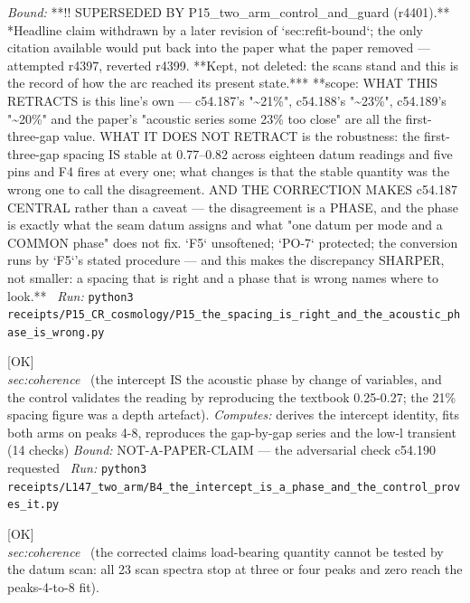 \begin{description}
 \emph{Bound:} **!! SUPERSEDED BY P15\_two\_arm\_control\_and\_guard (r4401).** *Headline claim withdrawn by a later revision of `sec:refit-bound`; the only citation available would put back into the paper what the paper removed --- attempted r4397, reverted r4399. **Kept, not deleted: the scans stand and this is the record of how the arc reached its present state.*** **scope: WHAT THIS RETRACTS is this line's own --- c54.187's "\textasciitilde{}21\%", c54.188's "\textasciitilde{}23\%", c54.189's "\textasciitilde{}20\%" and the paper's "acoustic series some 23\% too close" are all the first-three-gap value. WHAT IT DOES NOT RETRACT is the robustness: the first-three-gap spacing IS stable at 0.77--0.82 across eighteen datum readings and five pins and F4 fires at every one; what changes is that the stable quantity was the wrong one to call the disagreement. AND THE CORRECTION MAKES c54.187 CENTRAL rather than a caveat --- the disagreement is a PHASE, and the phase is exactly what the seam datum assigns and what "one datum per mode and a COMMON phase" does not fix. `F5` unsoftened; `PO-7` protected; the conversion runs by `F5`'s stated procedure --- and this makes the discrepancy SHARPER, not smaller: a spacing that is right and a phase that is wrong names where to look.**
\ \emph{Run:} \texttt{python3 receipts/P15\_CR\_cosmology/P15\_the\_spacing\_is\_right\_and\_the\_acoustic\_phase\_is\_wrong.py}
\item[\label{rcpt:B4_the_intercept_is_a_phase_and_the_control_proves_it}\textbf{}\quad\texttt{B4\_the\_intercept\_is\_a\_phase\_and\_the\_control\_proves\_it}]\hfill\textsf{[OK]}\\
\textit{sec:coherence} \ (the intercept IS the acoustic phase by change of variables, and the control validates the reading by reproducing the textbook 0.25-0.27; the 21\% spacing figure was a depth artefact). 
\emph{Computes:} derives the intercept identity, fits both arms on peaks 4-8, reproduces the gap-by-gap series and the low-l transient (14 checks)
 \emph{Bound:} NOT-A-PAPER-CLAIM --- the adversarial check c54.190 requested
\ \emph{Run:} \texttt{python3 receipts/L147\_two\_arm/B4\_the\_intercept\_is\_a\_phase\_and\_the\_control\_proves\_it.py}
\item[\label{rcpt:B5_the_scan_cannot_test_the_asymptotic_phase}\textbf{}\quad\texttt{B5\_the\_scan\_cannot\_test\_the\_asymptotic\_phase}]\hfill\textsf{[OK]}\\
\textit{sec:coherence} \ (the corrected claims load-bearing quantity cannot be tested by the datum scan: all 23 scan spectra stop at three or four peaks and zero reach the peaks-4-to-8 fit). 

\end{description}
